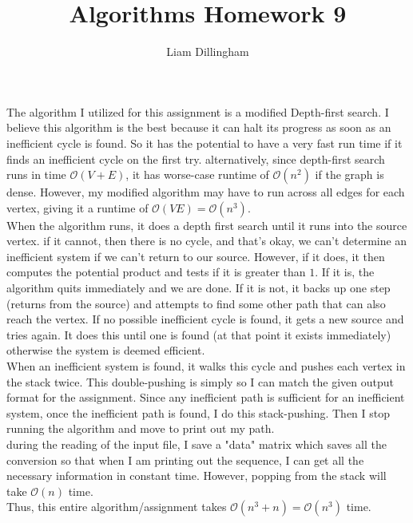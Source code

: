 \documentclass[20pt]{article} %
\title{Algorithms Homework 9}
\author{Liam Dillingham}
\begin{document}
\maketitle

The algorithm I utilized for this assignment is a modified Depth-first search.  I believe this algorithm is the best because it can halt its progress as soon as an inefficient cycle is found.  So it has the potential to have a very fast run time if it finds an inefficient cycle on the first try. alternatively, since depth-first search runs in time $\mathcal{O}(V + E)$, it has worse-case runtime of $\mathcal{O}(n^{2})$ if the graph is dense. However, my modified algorithm may have to run across all edges for each vertex, giving it a runtime of $\mathcal{O}(VE) = \mathcal{O}(n^{3})$.\\

When the algorithm runs, it does a depth first search until it runs into the source vertex.  if it cannot, then there is no cycle, and that's okay, we can't determine an inefficient system if we can't return to our source.  However, if it does, it then computes the potential product and tests if it is greater than $1$.  If it is, the algorithm quits immediately and we are done.  If it is not, it backs up one step (returns from the source) and attempts to find some other path that can also reach the vertex.  If no possible inefficient cycle is found, it gets a new source and tries again.  It does this until one is found (at that point it exists immediately) otherwise the system is deemed efficient. \\

When an inefficient system is found, it walks this cycle and pushes each vertex in the stack twice.  This double-pushing is simply so I can match the given output format for the assignment.  Since any inefficient path is sufficient for an inefficient system, once the inefficient path is found, I do this stack-pushing.  Then I stop running the algorithm and move to print out my path. \\ during the reading of the input file, I save a "data" matrix which saves all the conversion so that when I am printing out the sequence, I can get all the necessary information in constant time. However, popping from the stack will take $\mathcal{O}(n)$ time. \\

Thus, this entire algorithm/assignment takes $\mathcal{O}(n^{3} + n) = \mathcal{O}(n^{3})$ time. 
\end{document}
